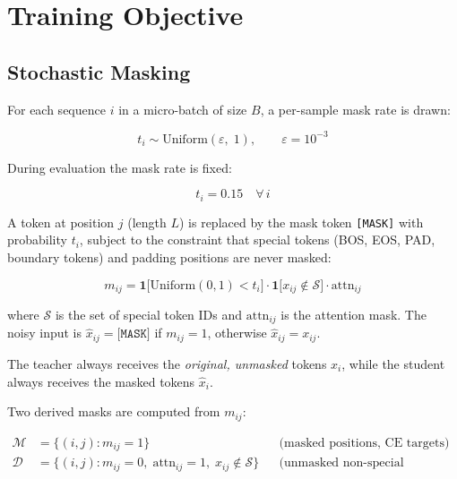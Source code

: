 \documentclass[11pt,a4paper]{article}
\begin{document}
\section{Training Objective}

\subsection{Stochastic Masking}
\label{sec:masking}

For each sequence $i$ in a micro-batch of size $B$, a per-sample mask rate is drawn:

\begin{equation}
  t_i \sim \mathrm{Uniform}(\varepsilon,\; 1), \qquad \varepsilon = 10^{-3}
\end{equation}

During evaluation the mask rate is fixed:

\begin{equation}
  t_i = 0.15 \quad \forall\, i
\end{equation}

A token at position $j$ (length $L$) is replaced by the mask token \texttt{[MASK]} with probability
$t_i$, subject to the constraint that special tokens (BOS, EOS, PAD, boundary tokens) and padding
positions are never masked:

\begin{equation}
  m_{ij} = \mathbf{1}\!\bigl[\mathrm{Uniform}(0,1) < t_i\bigr]
            \cdot \mathbf{1}\!\bigl[x_{ij} \notin \mathcal{S}\bigr]
            \cdot \mathrm{attn}_{ij}
\end{equation}

where $\mathcal{S}$ is the set of special token IDs and $\mathrm{attn}_{ij}$ is the attention mask.
The noisy input is $\hat{x}_{ij} = \texttt{[MASK]}$ if $m_{ij}=1$, otherwise $\hat{x}_{ij} = x_{ij}$.

The teacher always receives the \emph{original, unmasked} tokens $x_i$, while the student always
receives the masked tokens $\hat{x}_i$.

Two derived masks are computed from $m_{ij}$:

\begin{align}
  \mathcal{M} &= \{(i,j) : m_{ij} = 1\} && \text{(masked positions, CE targets)} \\
  \mathcal{D} &= \{(i,j) : m_{ij} = 0,\;\mathrm{attn}_{ij}=1,\;x_{ij}\notin\mathcal{S}\}
              && \text{(unmasked non-special positions, JEPA targets)}
\end{align}
\end{document}
